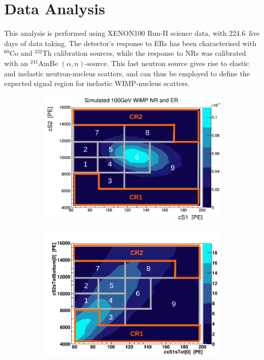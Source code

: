 \section{Data Analysis}
\label{sec:analysis}

This analysis is performed using XENON100 Run-II science data, with 224.6~live days of data taking. The detector's response to ERs has been characterised with $^{60}$Co and $^{232}$Th calibration sources, while the response to NRs was calibrated with an $^{241}$AmBe $(\alpha,n)$-source. This fast neutron source gives rise to elastic and inelastic neutron-nucleus scatters, and can thus be employed to define the expected signal region for inelastic WIMP-nucleus scatters.


\begin{figure}[t!]
	\begin{subfigure}{0.49\linewidth}
		\includegraphics[width=\linewidth]{images/wimp_in_sr.png}
		\subcaption{}
	\end{subfigure}
	\begin{subfigure}{0.49\linewidth}
		\includegraphics[width=\linewidth]{images/bkg_in_sr.png}

\end{subfigure}
\end{figure}
